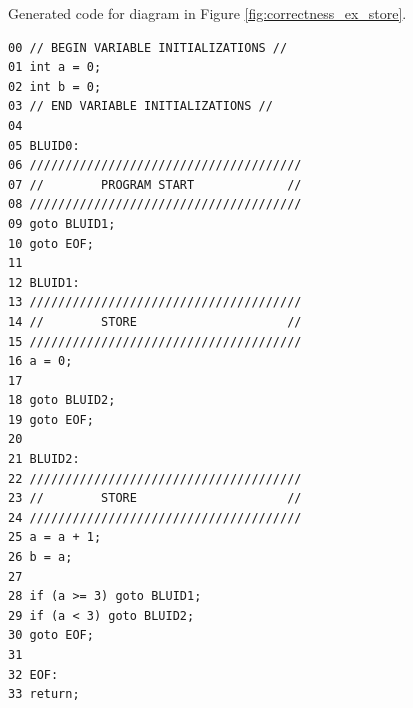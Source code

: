 Generated  code for diagram in Figure \ref{fig:correctness_ex_store}.
\begin{lstlisting}[frame=single]
00 // BEGIN VARIABLE INITIALIZATIONS //
01 int a = 0;
02 int b = 0;
03 // END VARIABLE INITIALIZATIONS //
04
05 BLUID0:
06 //////////////////////////////////////
07 //        PROGRAM START             //
08 //////////////////////////////////////
09 goto BLUID1;
10 goto EOF;
11
12 BLUID1:
13 //////////////////////////////////////
14 //        STORE                     //
15 //////////////////////////////////////
16 a = 0;
17 
18 goto BLUID2;
19 goto EOF;
20
21 BLUID2:
22 //////////////////////////////////////
23 //        STORE                     //
24 //////////////////////////////////////
25 a = a + 1;
26 b = a;
27
28 if (a >= 3) goto BLUID1;
29 if (a < 3) goto BLUID2;
30 goto EOF;
31
32 EOF:
33 return;
\end{lstlisting}


